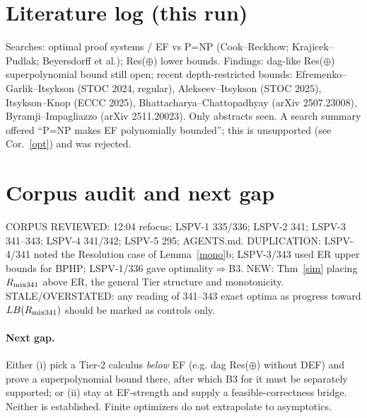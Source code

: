 \documentclass[11pt]{article}
\begin{document}
\section{Literature log (this run)}
Searches: optimal proof systems / EF vs P=NP (Cook--Reckhow; Krajicek--Pudlak; Beyersdorff et al.); Res($\oplus$) lower bounds. Findings: dag-like Res($\oplus$) superpolynomial bound still open; recent depth-restricted bounds: Efremenko--Garlik--Itsykson (STOC 2024, regular), Alekseev--Itsykson (STOC 2025), Itsykson--Knop (ECCC 2025), Bhattacharya--Chattopadhyay (arXiv 2507.23008), Byramji--Impagliazzo (arXiv 2511.20023). Only abstracts seen. A search summary offered ``P=NP makes EF polynomially bounded''; this is unsupported (see Cor.~\ref{opt}) and was rejected.

\section{Corpus audit and next gap}
CORPUS REVIEWED: 12:04 refocus; LSPV-1 335/336; LSPV-2 341; LSPV-3 341--343; LSPV-4 341/342; LSPV-5 295; AGENTS.md. DUPLICATION: LSPV-4/341 noted the Resolution case of Lemma~\ref{mono}b; LSPV-3/343 used ER upper bounds for BPHP; LSPV-1/336 gave optimality$\Rightarrow$B3. NEW: Thm~\ref{sim} placing $R_{\rm mix341}$ above ER, the general Tier structure and monotonicity. STALE/OVERSTATED: any reading of 341--343 exact optima as progress toward $LB(R_{\rm mix341})$ should be marked as controls only.
\paragraph{Next gap.} Either (i) pick a Tier-2 calculus \emph{below} EF (e.g. dag Res($\oplus$) without DEF) and prove a superpolynomial bound there, after which B3 for it must be separately supported; or (ii) stay at EF-strength and supply a feasible-correctness bridge. Neither is established. Finite optimizers do not extrapolate to asymptotics.
\end{document}
